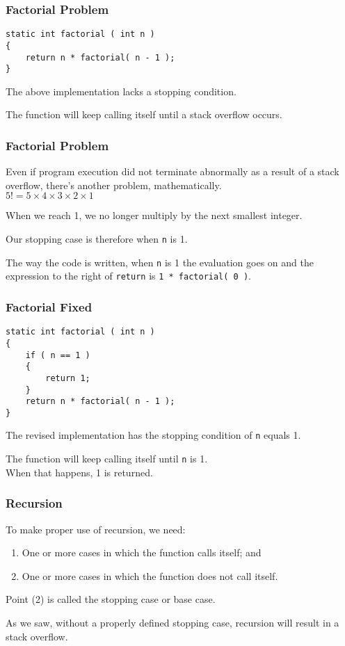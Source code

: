 \begin{frame}[fragile]
\frametitle{Factorial Problem}
\begin{verbatim}
static int factorial ( int n )
{
    return n * factorial( n - 1 );
}
\end{verbatim}

The above implementation lacks a \alert{stopping condition}.

The function will keep calling itself until a stack overflow occurs.

\end{frame}

\begin{frame}
\frametitle{Factorial Problem}

Even if program execution did not terminate abnormally as a result of a stack overflow, there's another problem, mathematically.\\
\quad $5! = 5 \times 4 \times 3 \times 2 \times 1$

When we reach 1, we no longer multiply by the next smallest integer.

Our stopping case is therefore when \texttt{n} is 1.

The way the code is written, when \texttt{n} is 1 the evaluation goes on and the expression to the right of \texttt{return} is \texttt{1 * factorial( 0 )}. 

\end{frame}

\begin{frame}[fragile]
\frametitle{Factorial Fixed}
\begin{verbatim}
static int factorial ( int n )
{
    if ( n == 1 )
    {
        return 1;
    }
    return n * factorial( n - 1 );
}
\end{verbatim}

The revised implementation has the stopping condition of \texttt{n} equals 1.

The function will keep calling itself until \texttt{n} is 1.\\
\quad When that happens, 1 is returned.

\end{frame}

\begin{frame}
\frametitle{Recursion}
To make proper use of recursion, we need:
\begin{enumerate}
	\item One or more cases in which the function calls itself; and
	\item One or more cases in which the function does not call itself.
\end{enumerate}

Point (2) is called the stopping case or base case.

As we saw, without a properly defined stopping case, recursion will result in a stack overflow.

\end{frame}

